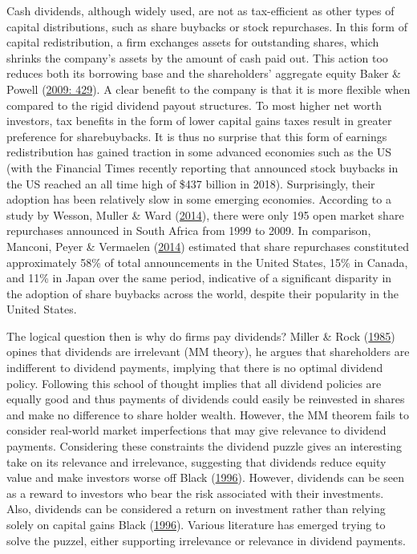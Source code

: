 \documentclass[11pt,preprint, authoryear]{elsarticle}
\numberwithin{equation}{section}
\numberwithin{figure}{section}
\numberwithin{table}{section}
\begin{document}
Cash dividends, although widely used, are not as tax-efficient as other
types of capital distributions, such as share buybacks or stock
repurchases. In this form of capital redistribution, a firm exchanges
assets for outstanding shares, which shrinks the company's assets by the
amount of cash paid out. This action too reduces both its borrowing base
and the shareholders' aggregate equity Baker \& Powell
(\protect\hyperlink{ref-baker2009understanding}{2009: 429}). A clear
benefit to the company is that it is more flexible when compared to the
rigid dividend payout structures. To most higher net worth investors,
tax benefits in the form of lower capital gains taxes result in greater
preference for sharebuybacks. It is thus no surprise that this form of
earnings redistribution has gained traction in some advanced economies
such as the US (with the Financial Times recently reporting that
announced stock buybacks in the US reached an all time high of \$437
billion in 2018). Surprisingly, their adoption has been relatively slow
in some emerging economies. According to a study by Wesson, Muller \&
Ward (\protect\hyperlink{ref-wesson2014market}{2014}), there were only
195 open market share repurchases announced in South Africa from 1999 to
2009. In comparison, Manconi, Peyer \& Vermaelen
(\protect\hyperlink{ref-manconi2014buybacks}{2014}) estimated that share
repurchases constituted approximately 58\% of total announcements in the
United States, 15\% in Canada, and 11\% in Japan over the same period,
indicative of a significant disparity in the adoption of share buybacks
across the world, despite their popularity in the United States.

The logical question then is why do firms pay dividends? Miller \& Rock
(\protect\hyperlink{ref-miller1985dividend}{1985}) opines that dividends
are irrelevant (MM theory), he argues that shareholders are indifferent
to dividend payments, implying that there is no optimal dividend policy.
Following this school of thought implies that all dividend policies are
equally good and thus payments of dividends could easily be reinvested
in shares and make no difference to share holder wealth. However, the MM
theorem fails to consider real-world market imperfections that may give
relevance to dividend payments. Considering these constraints the
dividend puzzle gives an interesting take on its relevance and
irrelevance, suggesting that dividends reduce equity value and make
investors worse off Black
(\protect\hyperlink{ref-black1996dividend}{1996}). However, dividends
can be seen as a reward to investors who bear the risk associated with
their investments. Also, dividends can be considered a return on
investment rather than relying solely on capital gains Black
(\protect\hyperlink{ref-black1996dividend}{1996}). Various literature
has emerged trying to solve the puzzel, either supporting irrelevance or
relevance in dividend payments.
\end{document}
